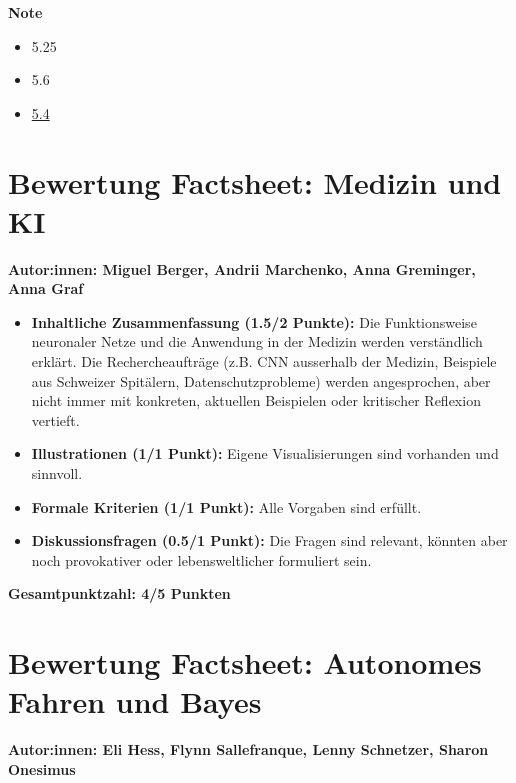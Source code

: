 \textbf{Note}
\begin{itemize}
    \item[\textbf{Factsheet}] 5.25
    \item[\textbf{Vortrag}] 5.6
    \item[\textbf{Gesamtnote}]  \underline{5.4}
\end{itemize}


\newpage


\section*{Bewertung Factsheet: Medizin und KI}

\textbf{Autor:innen: Miguel Berger, Andrii Marchenko, Anna Greminger, Anna Graf}

\begin{itemize}
    \item \textbf{Inhaltliche Zusammenfassung (1.5/2 Punkte):} Die Funktionsweise neuronaler Netze und die Anwendung in der Medizin werden verständlich erklärt. Die Rechercheaufträge (z.B. CNN ausserhalb der Medizin, Beispiele aus Schweizer Spitälern, Datenschutzprobleme) werden angesprochen, aber nicht immer mit konkreten, aktuellen Beispielen oder kritischer Reflexion vertieft.
    \item \textbf{Illustrationen (1/1 Punkt):} Eigene Visualisierungen sind vorhanden und sinnvoll.
    \item \textbf{Formale Kriterien (1/1 Punkt):} Alle Vorgaben sind erfüllt.
    \item \textbf{Diskussionsfragen (0.5/1 Punkt):} Die Fragen sind relevant, könnten aber noch provokativer oder lebensweltlicher formuliert sein.
\end{itemize}

\textbf{Gesamtpunktzahl: 4/5 Punkten}

\newpage


\section*{Bewertung Factsheet: Autonomes Fahren und Bayes}

\textbf{Autor:innen: Eli Hess, Flynn Sallefranque, Lenny Schnetzer, Sharon Onesimus}


